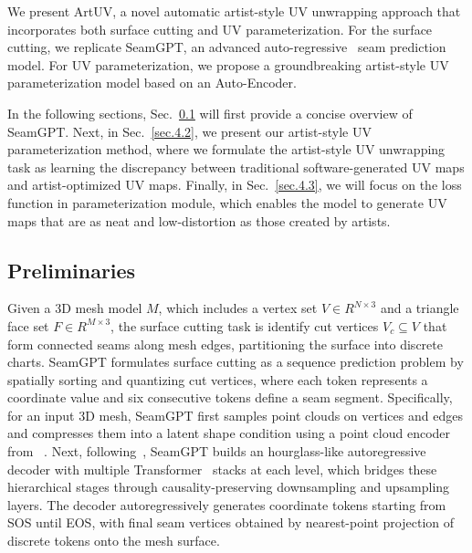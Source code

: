 \documentclass{article}
\begin{document}
We present ArtUV, a novel automatic artist-style UV unwrapping approach that incorporates both surface cutting and UV parameterization. For the surface cutting, we replicate SeamGPT, an advanced auto-regressive~\cite{lutkepohl2013vector} seam prediction model. For UV parameterization, we propose a groundbreaking artist-style UV parameterization model based on an Auto-Encoder.

In the following sections, Sec.~\ref{sec.4.1} will first provide a concise overview of SeamGPT. Next, in Sec.~\ref{sec.4.2}, we present our artist-style UV parameterization method, where we formulate the artist-style UV unwrapping task as learning the discrepancy between traditional software-generated UV maps and artist-optimized UV maps. Finally, in Sec.~\ref{sec.4.3}, we will focus on the loss function in parameterization module, which enables the model to generate UV maps that are as neat and low-distortion as those created by artists.

\subsection{Preliminaries}
\label{sec.4.1}
Given a 3D mesh model ${M}$, which includes a vertex set ${V}\in{R} ^{N\times 3}$ and a triangle face set ${F}\in{R}^{M\times 3}$, the surface cutting task is identify cut vertices $V_{c} \subseteq V$ that form connected seams along mesh edges, partitioning the surface into discrete charts. SeamGPT formulates surface cutting as a sequence prediction problem by spatially sorting and quantizing cut vertices, where each token represents a coordinate value and six consecutive tokens define a seam segment. Specifically, for an input 3D mesh, SeamGPT first samples point clouds on vertices and edges and compresses them into a latent shape condition using a point cloud encoder from ~\cite{zhao2025hunyuan3d}. Next, following~\cite{hao2024meshtron}, SeamGPT builds an hourglass-like autoregressive decoder with multiple Transformer~\cite{vaswani2017attention} stacks at each level, which bridges these hierarchical stages through causality-preserving downsampling and upsampling layers. The decoder autoregressively generates coordinate tokens starting from SOS until EOS, with final seam vertices obtained by nearest-point projection of discrete tokens onto the mesh surface.
\end{document}
